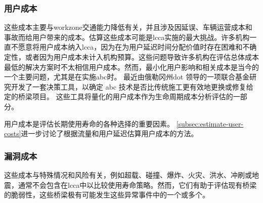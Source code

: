 \subsubsection{用户成本}\label{subsubsec:user-costs}
这些成本主要与\gls*{workzone}交通能力降低有关，并且涉及因延误、车辆运营成本和事故而给用户带来的成本。估算这些成本可能是\acrlong*{lcca}实施的最大挑战。许多机构一直不愿意将用户成本纳入\acrlong*{lcca}，因为在为用户延迟时间分配价值时存在困难和不确定性，或者因为用户成本未计入机构预算。这些问题导致许多机构在评估总体成本最低的解决方案时不太相信用户成本。然而，最小化用户影响和相关成本是当今的一个主要问题，尤其是在实施\gls{abc}时。 最近由俄勒冈州\acrshort*{dot} \cite{doolen2011a} 领导的一项联合基金研究开发了一套决策工具，以确定 \gls{abc} 技术是否比传统施工更有效地更换或修复给定的桥梁项目。 这些工具将量化的用户成本作为生命周期成本分析评估的一部分。

用户成本是评估长期使用寿命的各种选择的重要因素。 \cref{subsec:estimate-user-costs}进一步讨论了根据流量和用户延迟估算用户成本的方法。

\subsubsection{漏洞成本}
这些成本与特殊情况和风险有关，例如超载、碰撞、爆炸、火灾、洪水、冲刷或地震，通常不会包含在\acrlong*{lcca}中以比较使用寿命策略。然而，它们有助于评估现有桥梁的脆弱性，这些桥梁极有可能发生这些异常事件中的一个或多个。

